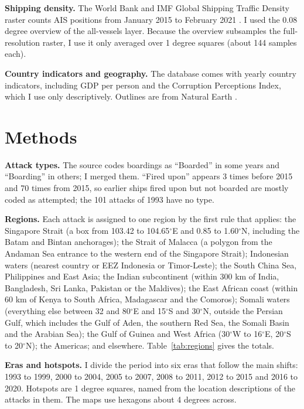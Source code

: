 \documentclass[11pt,a4paper]{article}
\begin{document}
\textbf{Shipping density.} The World Bank and IMF Global Shipping Traffic Density raster counts AIS positions from January 2015 to February 2021 \citep{wbships,cerdeiro}. I used the 0.08 degree overview of the all-vessels layer. Because the overview subsamples the full-resolution raster, I use it only averaged over 1 degree squares (about 144 samples each).

\textbf{Country indicators and geography.} The database comes with yearly country indicators, including GDP per person and the Corruption Perceptions Index, which I use only descriptively. Outlines are from Natural Earth \citep{naturalearth}.

\section{Methods}
\textbf{Attack types.} The source codes boardings as ``Boarded'' in some years and ``Boarding'' in others; I merged them. ``Fired upon'' appears 3 times before 2015 and 70 times from 2015, so earlier ships fired upon but not boarded are mostly coded as attempted; the 101 attacks of 1993 have no type.

\textbf{Regions.} Each attack is assigned to one region by the first rule that applies: the Singapore Strait (a box from 103.42 to 104.65$^\circ$E and 0.85 to 1.60$^\circ$N, including the Batam and Bintan anchorages); the Strait of Malacca (a polygon from the Andaman Sea entrance to the western end of the Singapore Strait); Indonesian waters (nearest country or EEZ Indonesia or Timor-Leste); the South China Sea, Philippines and East Asia; the Indian subcontinent (within 300 km of India, Bangladesh, Sri Lanka, Pakistan or the Maldives); the East African coast (within 60 km of Kenya to South Africa, Madagascar and the Comoros); Somali waters (everything else between 32 and 80$^\circ$E and 15$^\circ$S and 30$^\circ$N, outside the Persian Gulf, which includes the Gulf of Aden, the southern Red Sea, the Somali Basin and the Arabian Sea); the Gulf of Guinea and West Africa (30$^\circ$W to 16$^\circ$E, 20$^\circ$S to 20$^\circ$N); the Americas; and elsewhere. Table~\ref{tab:regions} gives the totals.

\textbf{Eras and hotspots.} I divide the period into six eras that follow the main shifts: 1993 to 1999, 2000 to 2004, 2005 to 2007, 2008 to 2011, 2012 to 2015 and 2016 to 2020. Hotspots are 1 degree squares, named from the location descriptions of the attacks in them. The maps use hexagons about 4 degrees across.
\end{document}
